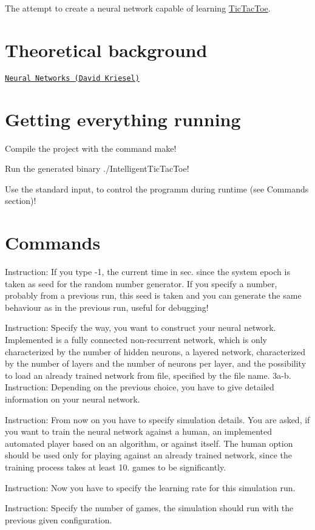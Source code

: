 The attempt to create a neural network capable of learning \hyperlink{class_tic_tac_toe}{Tic\+Tac\+Toe}.

\section*{Theoretical background}

\href{http://www.dkriesel.com/_media/science/neuronalenetze-en-zeta2-2col-dkrieselcom.pdf}{\tt Neural Networks (David Kriesel)}

\section*{Getting everything running}


\begin{DoxyEnumerate}
\item Compile the project with the command \textquotesingle{}make\textquotesingle{}!
\item Run the generated binary \textquotesingle{}./\+Intelligent\+Tic\+Tac\+Toe\textquotesingle{}!
\item Use the standard input, to control the programm during runtime (see Commands section)!
\end{DoxyEnumerate}

\section*{Commands}


\begin{DoxyEnumerate}
\item Instruction\+: If you type \textquotesingle{}-\/1\textquotesingle{}, the current time in sec. since the system epoch is taken as seed for the random number generator. If you specify a number, probably from a previous run, this seed is taken and you can generate the same behaviour as in the previous run, useful for debugging!
\item Instruction\+: Specify the way, you want to construct your neural network. Implemented is a fully connected non-\/recurrent network, which is only characterized by the number of hidden neurons, a layered network, characterized by the number of layers and the number of neurons per layer, and the possibility to load an already trained network from file, specified by the file name. 3a-\/b. Instruction\+: Depending on the previous choice, you have to give detailed information on your neural network.
\item Instruction\+: From now on you have to specify simulation details. You are asked, if you want to train the neural network against a human, an implemented automated player based on an algorithm, or against itself. The human option should be used only for playing against an already trained network, since the training process takes at least 10. games to be significantly.
\item Instruction\+: Now you have to specify the learning rate for this simulation run.
\item Instruction\+: Specify the number of games, the simulation should run with the previous given configuration.
\end{DoxyEnumerate}

